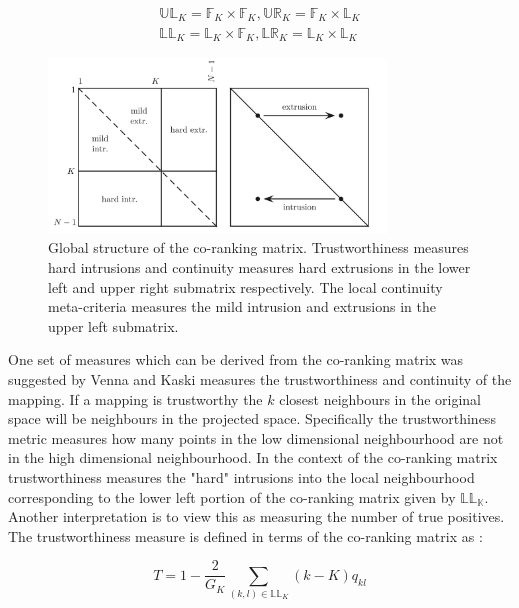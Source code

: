 \begin{align}
	\mathbb{UL}_K = \mathbb{F}_K \times \mathbb{F}_K,  \mathbb{UR}_K = \mathbb{F}_K \times \mathbb{L}_K
	\\
	\mathbb{LL}_K = \mathbb{L}_K \times \mathbb{F}_K,  \mathbb{LR}_K = \mathbb{L}_K \times \mathbb{L}_K
\end{align}

\begin{figure}
	\label{fig:co-ranking-matrix}
	\centering
	\includegraphics[width=0.8\textwidth]{Images/co-ranking.png}	
	\caption{Global structure of the co-ranking matrix. Trustworthiness measures hard intrusions and continuity measures hard extrusions in the lower left and upper right submatrix respectively. The local continuity meta-criteria measures the mild intrusion and extrusions in the upper left submatrix.}
\end{figure}


One set of measures which can be derived from the co-ranking matrix was suggested by Venna and Kaski \cite{kaski2003trustworthiness} measures the trustworthiness and continuity of the mapping. If a mapping is trustworthy the $k$ closest neighbours in the original space will be neighbours in the projected space. Specifically the trustworthiness metric measures how many points in the low dimensional neighbourhood are not in the high dimensional neighbourhood. In the context of the co-ranking matrix trustworthiness measures the "hard" intrusions into the local neighbourhood corresponding to the lower left portion of the co-ranking matrix given by $\mathbb{LL_K}$. Another interpretation is to view this as measuring the number of true positives. The trustworthiness measure is defined in terms of the co-ranking matrix as \cite{lee2009quality}:

\begin{equation}
	T = 1 - \frac{2}{G_{K}} \sum\limits_{(k,l) \in \mathbb{LL}_K} (k - K)q_{kl}
\end{equation} 

